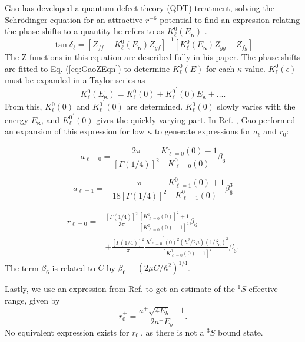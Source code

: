 \documentclass[preprint,showpacs,showkeys,preprintnumbers,amsmath,amssymb,longbibliography,pra,aps]{revtex4-1}
\begin{document}
Gao has developed a quantum defect theory (QDT) treatment, solving the
Schr\"{o}dinger equation for an attractive $r^{-6}$ potential to find
an expression relating the phase shifts to a quantity he refers to as
$K_\ell^0(E_{\bm \kappa})$ \cite{Gao1998}.
\begin{equation}
\label{eq:GaoZEqn}
\tan\delta_\ell = [Z_{ff} - K_\ell^0(E_{\bm \kappa}) Z_{gf}]^{-1}
  [K_\ell^0(E_{\bm \kappa}) Z_{gg} - Z_{fg}]
\end{equation}
The Z functions in this equation are described fully in his paper. The phase
shifts are fitted to Eq. (\ref{eq:GaoZEqn}) to determine $K_\ell^0(E)$ for each
$\kappa$ value. $K_\ell^0(\epsilon)$ must be expanded in a Taylor series as
\begin{equation}
\label{eq:GaoKTaylor}
K_\ell^0(E_{\bm \kappa}) = K_\ell^0(0) + {K_\ell^0}^\prime(0) E_{\bm \kappa}
  + \ldots.
\end{equation}
From this, $K_\ell^0(0)$ and ${K_\ell^0}^\prime(0)$ are determined.
$K_\ell^0(0)$ slowly varies with the energy $E_{\bm \kappa}$, and
${K_\ell^0}^\prime(0)$ gives the quickly varying part. In Ref. \cite{Gao1998a},
Gao performed an expansion of this expression for low $\kappa$ to generate
expressions for $a_\ell$ and $r_0$:

\begin{equation}
\label{eq:GaoScatLenS}
a_{\ell=0} = \frac{2\pi}{[\Gamma(1/4)]^2} \frac{K_{\ell=0}^0(0) - 1}
  {K_{\ell=0}^0(0)} \beta_6
\end{equation}

\begin{equation}
\label{eq:GaoScatLenP}
a_{\ell=1} = -\frac{\pi}{18[\Gamma(1/4)]^2} \frac{K_{\ell=1}^0(0) + 1}
  {K_{\ell=1}^0(0)} \beta_6^3
\end{equation}

\begin{align}
\label{eq:GaoEffRange}
r_{\ell=0} = &\frac{[\Gamma(1/4)]^2}{3\pi} \frac{[K_{\ell=0}^0(0)]^2 + 1}
  {[K_{\ell=0}^0(0) - 1]^2} \beta_6 \nonumber \\
&+ \frac{[\Gamma(1/4)]^2}{\pi} \frac{{K_{\ell=0}^0}^\prime(0)^2(\hbar^2/2\mu)
  (1/\beta_6)^2}{[K_{\ell=0}^0(0) - 1]^2} \beta_6.
\end{align}
The term $\beta_6$ is related to $C$ by $\beta_6 = (2\mu C/\hbar^2)^{1/4}$.

Lastly, we use an expression from Ref. \cite{Blackwood2002} to get an estimate
of the $^1S$ effective range, given by
\begin{equation}
\label{eq:BlackwoodERT}
r_0^+ = \frac{a^+ \sqrt{4 E_b} - 1}{2 a^+ E_b}.
\end{equation}
No equivalent expression exists for $r_0^-$, as there is not a $^3S$ bound state.
\end{document}
